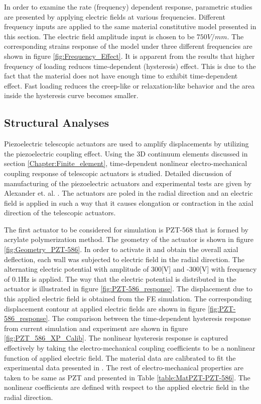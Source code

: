  
In order to examine the rate (frequency) dependent response, parametric studies are presented by applying electric fields at various frequencies. 
Different frequency inputs are applied to the same material constitutive model presented in this section. The electric field amplitude input is chosen to be $750 V/mm$.
The corresponding strains response of the model under three different frequencies are shown in figure \ref{fig:Frequency_Effect}. 
It is apparent from the results that higher frequency of loading reduces time-dependent (hysteresis) effect. 
This is due to the fact that the material does not have enough time to exhibit time-dependent effect. 
Fast loading reduces the creep-like or relaxation-like behavior and the area inside the hysteresis curve becomes smaller.  



\subsection{Structural Analyses}

Piezoelectric telescopic actuators are used to amplify displacements by utilizing the piezoelectric coupling effect. 
Using the 3D continuum elements discussed in section \ref{Chapter:Finite_element}, 
time-dependent nonlinear electro-mechanical coupling response of telescopic actuators is studied. Detailed discussion of manufacturing of the piezoelectric actuators and experimental tests are given by Alexander et. al. \cite{Alexander,Alexander2003,Alexander2001}. 
The actuators are poled in the radial direction and an electric field is applied in such a way that it causes elongation or contraction in the axial direction of the telescopic actuators. 

The first actuator to be considered for simulation is PZT-568 that is formed by acrylate polymerization method. 
The geometry of the actuator is shown in figure \ref{fig:Geometry_PZT-586}. 
In order to activate it and obtain the overall axial deflection, each wall was
subjected to electric field in the radial direction.
The alternating electric potential with amplitude of 300[V] and -300[V] with frequency of 0.1Hz is applied. 
The way that the electric potential is distributed in the actuator is illustrated in figure \ref{fig:PZT-586_response}. 
The displacement due to this applied electric field is obtained from the FE simulation. 
The corresponding displacement contour at applied electric fields are shown in figure \ref{fig:PZT-586_response}. 
The comparison between the time-dependent hysteresis response from current simulation and experiment are shown in figure \ref{fig:PZT_586_XP_Calib}. 
The nonlinear hysteresis response is captured effectively by taking the electro-mechanical coupling coefficients to be a nonlinear function of applied electric field. 
The material data are calibrated to fit the experimental data presented in \cite{Alexander,Alexander2003}. 
The rest of electro-mechanical properties are taken to be same as PZT and presented in Table \ref{table:MatPZT-PZT-586}. 
The nonlinear coefficients are defined with respect to the applied electric field in the radial direction.

